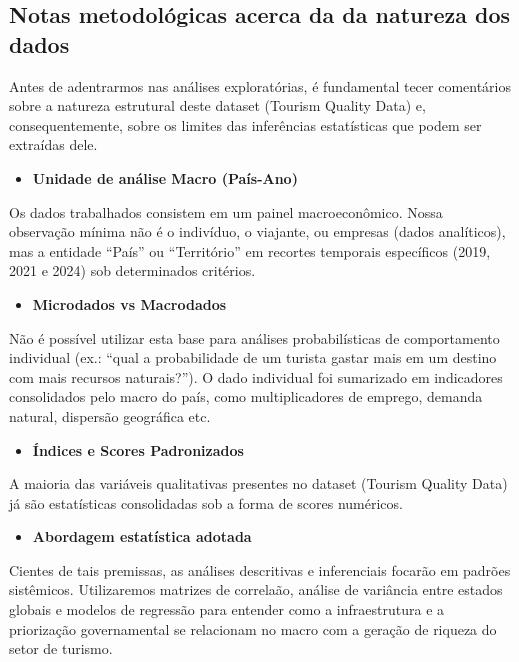 \documentclass[
]{article}
\providecommand{\tightlist}{%
  \setlength{\itemsep}{0pt}\setlength{\parskip}{0pt}}
\begin{document}
\subsection{Notas metodológicas acerca da da natureza dos
dados}\label{notas-metodoluxf3gicas-acerca-da-da-natureza-dos-dados}

Antes de adentrarmos nas análises exploratórias, é fundamental tecer
comentários sobre a natureza estrutural deste dataset (Tourism Quality
Data) e, consequentemente, sobre os limites das inferências estatísticas
que podem ser extraídas dele.

\begin{itemize}
\tightlist
\item
  \textbf{Unidade de análise Macro (País-Ano)}
\end{itemize}

Os dados trabalhados consistem em um painel macroeconômico. Nossa
observação mínima não é o indivíduo, o viajante, ou empresas (dados
analíticos), mas a entidade ``País'' ou ``Território'' em recortes
temporais específicos (2019, 2021 e 2024) sob determinados critérios.

\begin{itemize}
\tightlist
\item
  \textbf{Microdados vs Macrodados}
\end{itemize}

Não é possível utilizar esta base para análises probabilísticas de
comportamento individual (ex.: ``qual a probabilidade de um turista
gastar mais em um destino com mais recursos naturais?''). O dado
individual foi sumarizado em indicadores consolidados pelo macro do
país, como multiplicadores de emprego, demanda natural, dispersão
geográfica etc.

\begin{itemize}
\tightlist
\item
  \textbf{Índices e Scores Padronizados}
\end{itemize}

A maioria das variáveis qualitativas presentes no dataset (Tourism
Quality Data) já são estatísticas consolidadas sob a forma de scores
numéricos.

\begin{itemize}
\tightlist
\item
  \textbf{Abordagem estatística adotada}
\end{itemize}

Cientes de tais premissas, as análises descritivas e inferenciais
focarão em padrões sistêmicos. Utilizaremos matrizes de correlaão,
análise de variância entre estados globais e modelos de regressão para
entender como a infraestrutura e a priorização governamental se
relacionam no macro com a geração de riqueza do setor de turismo.
\end{document}
